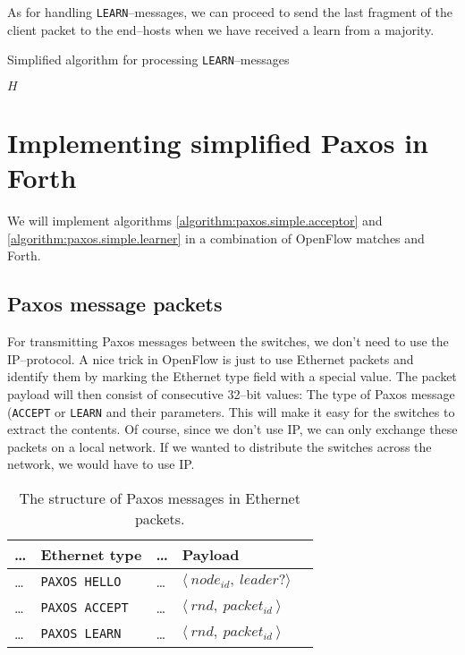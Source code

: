 As for handling \texttt{LEARN}--messages, we can proceed to send the last
fragment of the client packet to the end--hosts when we have received a
learn from a majority.

\begin{algorithm}
  \caption{Simplified algorithm for processing \texttt{LEARN}--messages}
  \label{algorithm:paxos.simple.learner}
  \begin{algorithmic}
    \State $H$ 
    \State

          \State {}
        \EndForIn
      \EndIf
    \EndOn
  \end{algorithmic}
\end{algorithm}

\section{Implementing simplified Paxos in Forth}

We will implement algorithms \ref{algorithm:paxos.simple.acceptor} 
and \ref{algorithm:paxos.simple.learner} in a combination of OpenFlow
matches and Forth.

\subsection{Paxos message packets}

For transmitting Paxos messages between the switches, we don't need to use
the IP--protocol.  A nice trick in OpenFlow is just to use Ethernet packets
and identify them by marking the Ethernet type field with a special value.
The packet payload will then consist of consecutive 32--bit values: The type of
Paxos message (\texttt{ACCEPT} or \texttt{LEARN} and their parameters.
This will make it easy for the switches to extract the contents.
Of course, since we don't use IP, we can only exchange these packets on a
local network.  If we wanted to distribute the switches across the network,
we would have to use IP.

\begin{table}[H]
  \centering
  \begin{tabular}{l|l|l|l|l|}
    \hline \dots & \textbf{Ethernet type} & \dots & \textbf{Payload} \\
    \hline \dots & \texttt{PAXOS HELLO}  & \dots & $ \langle\ node_{id},\ leader? \rangle $ \\
    \hline \dots & \texttt{PAXOS ACCEPT} & \dots & $ \langle\ rnd,\ packet_{id}\ \rangle $ \\
    \hline \dots & \texttt{PAXOS LEARN}  & \dots & $ \langle\ rnd,\ packet_{id}\ \rangle $ \\
    \hline
  \end{tabular}

  \caption{The structure of Paxos messages in Ethernet packets.}
  \label{table:paxos.ethernet.packet}
\end{table}

